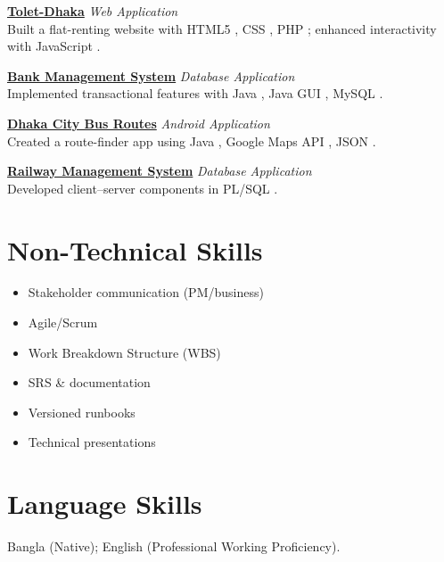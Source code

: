 \documentclass[10pt,letterpaper]{article}
\newcommand{\pill}[1]{%
  \begingroup\setlength{\fboxsep}{1.2pt}%
  \colorbox{brandblue!12}{\textcolor{brandblue}{\scriptsize #1}}%
  \endgroup
}
\begin{document}
\textbf{\href{http://v1nay.is-a.dev/}{Tolet-Dhaka}}  \textbar{} \textit{Web Application} \\
Built a flat-renting website with \pill{HTML5}, \pill{CSS}, \pill{PHP}; enhanced interactivity with \pill{JavaScript}. \medskip

\textbf{\href{http://v1nay.is-a.dev/}{Bank Management System}}  \textbar{} \textit{Database Application} \\
Implemented transactional features with \pill{Java}, \pill{Java GUI}, \pill{MySQL}. \medskip

\textbf{\href{http://v1nay.is-a.dev/}{Dhaka City Bus Routes}}  \textbar{} \textit{Android Application} \\
Created a route-finder app using \pill{Java}, \pill{Google Maps API}, \pill{JSON}. \medskip

\textbf{\href{http://v1nay.is-a.dev/}{Railway Management System}}  \textbar{} \textit{Database Application} \\
Developed client–server components in \pill{PL/SQL}.

\section{Non-Technical Skills}
\begin{itemize}[leftmargin=1.5em]
  \item Stakeholder communication (PM/business)
  \item Agile/Scrum
  \item Work Breakdown Structure (WBS)
  \item SRS \& documentation
  \item Versioned runbooks
  \item Technical presentations
\end{itemize}

\section{Language Skills}
Bangla (Native); English (Professional Working Proficiency).
\end{document}

